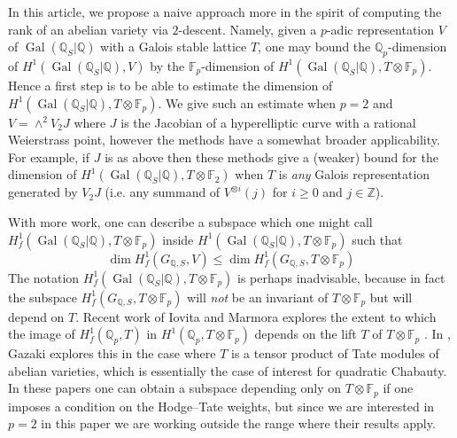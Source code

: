 \documentclass[11pt]{amsart}
\def\Q{\mathbb Q}
\def\F{\mathbb F}
\theoremstyle{plain}
\theoremstyle{definition}
\DeclareMathOperator{\Gal}{Gal}
\newcommand{\ad}{\mathrm{ad}}
\begin{document}

In this article, we propose a naive approach more in the spirit of computing the rank of an abelian variety via $2$-descent. Namely, given a $p$-adic representation $V$ of $\Gal (\Q _S |\Q )$ with a Galois stable lattice $T$, one may bound the $\Q _p $-dimension of $H^1 (\Gal (\Q _S |\Q ),V)$ by the $\F _p $-dimension of $H^1 (\Gal (\Q _S |\Q ),T\otimes \F _p )$. Hence a first step is to be able to estimate the dimension of $H^1 (\Gal (\Q _S |\Q ),T\otimes \F _p )$. We give such an estimate when $p=2$ and $V=\wedge ^2 V_2 J$ where $J$ is the Jacobian of a hyperelliptic curve with a rational Weierstrass point, however the methods have a somewhat broader applicability. For example, if $J$ is as above then these methods give a (weaker) bound for the dimension of $H^1 (\Gal (\Q _S |\Q ),T\otimes \F _2 )$ when $T$ is \textit{any} Galois representation generated by $V_2 J$ (i.e. any summand of $V^{\otimes i}(j)$ for $i\geq 0$ and $j\in \mathbb{Z}$).

With more work, one can describe a subspace which one might call $H^1 _f (\Gal (\Q _S |\Q ),T\otimes \F _p )$ inside $H^1 (\Gal (\Q _S |\Q ),T\otimes \F _p )$ such that
\[
\dim H^1 _f (G_{\Q ,S},V)\leq \dim H^1 _ f (G_{\Q ,S},T\otimes \F _p )
\]
The notation $H^1 _f (\Gal (\Q _S |\Q ),T\otimes \F _p )$ is perhaps inadvisable, because in fact the subspace $H^1 _f (G_{\Q ,S},T\otimes \F _p )$ will \textit{not} be an invariant of $T\otimes \F _p $ but will depend on $T$. Recent work of Iovita and Marmora explores the extent to which the image of $H^1 _f (\Q _p ,T)$ in $H^1 (\Q _p ,T\otimes \F _p )$ depends on the lift $T$ of $T\otimes \F _p $ \cite{IM15}. In \cite{gazaki}, Gazaki explores this in the case where $T$ is a tensor product of Tate modules of abelian varieties, which is essentially the case of interest for quadratic Chabauty. In these papers one can obtain a subspace depending only on $T\otimes \F _p $ if one imposes a condition on the Hodge--Tate weights, but since we are interested in $p=2$ in this paper we are working outside the range where their results apply.
\end{document}
